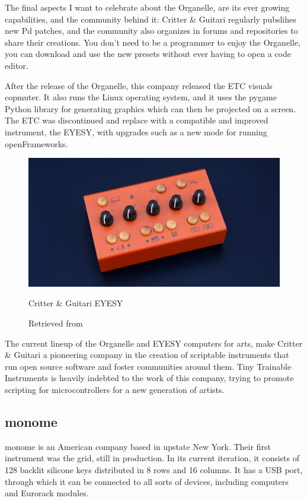 The final aspects I want to celebrate about the Organelle, are its ever growing capabilities, and the community behind it: Critter \& Guitari regularly pubslihes new \acrshort{Pd} patches, and the community also organizes in forums and repositories to share their creations. You don't need to be a programmer to enjoy the Organelle, you can download and use the new presets without ever having to open a code editor.

After the release of the Organelle, this company released the ETC visuals copmuter. It also runs the Linux operating system, and it uses the pygame Python library for generating graphics which can then be projected on a screen.  The ETC was discontinued and replace with a compatible and improved instrument, the EYESY, with upgrades such as a new mode for running openFrameworks.

\begin{figure}[ht]
  \centering
  \includegraphics[width=0.75\linewidth,height=0.25\textheight,keepaspectratio]{images/critter-and-guitari-eyesy.jpg}
  \caption{Critter \& Guitari EYESY}
  \caption*{Retrieved from \cite{website-critter-and-guitari-current}}
  \label{fig:critter-and-guitari-eyesy}
\end{figure}

The current lineup of the Organelle and EYESY computers for arts, make Critter \& Guitari a pioneering company in the creation of scriptable instruments that run open source software and foster communities around them. Tiny Trainable Instruments is heavily indebted to the work of this company, trying to promote scripting for microcontrollers for a new generation of artists.

\subsection{monome}

monome \cite{website-monome-current} is an American company based in upstate New York. Their first instrument was the grid, still in production. In its current iteration, it consists of 128 backlit silicone keys distributed in 8 rows and 16 columns. It has a USB port, through which it can be connected to all sorts of devices, including computers and Eurorack modules.

